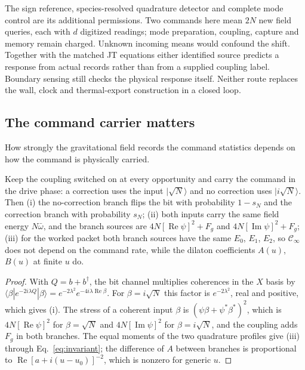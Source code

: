 The sign reference, species-resolved quadrature detector and complete mode
control are its additional permissions. Two commands here mean $2N$ new field
queries, each with $d$ digitized readings; mode preparation, coupling, capture
and memory remain charged. Unknown incoming means would confound the shift.
Together with the matched JT equations either identified source predicts a
response from actual records rather than from a supplied coupling label.
Boundary sensing still checks the physical response itself. Neither route
replaces the wall, clock and thermal-export construction in a closed loop.


\subsection{The command carrier matters}

How strongly the gravitational field records the command statistics depends on how the command is physically carried.

\begin{proposition}
\label{prop:carrier}
Keep the coupling switched on at every opportunity and carry the command in the drive phase: a correction uses the input $|\sqrt N\rangle$ and no correction uses $|i\sqrt N\rangle$. Then (i) the no-correction branch flips the bit with probability $1-s_N$ and the correction branch with probability $s_N$; (ii) both inputs carry the same field energy $N\bar\omega$, and the branch sources are $4N[\operatorname{Re}\psi]^2+F_g$ and $4N[\operatorname{Im}\psi]^2+F_g$; (iii) for the worked packet both branch sources have the same $E_0$, $E_1$, $E_2$, so $\mathcal C_\infty$ does not depend on the command rate, while the dilaton coefficients $A(u)$, $B(u)$ at finite $u$ do.
\end{proposition}

\begin{proof}
With $Q=b+b^\dagger$, the bit channel multiplies coherences in the $X$ basis by $\langle\beta|e^{-2i\lambda Q}|\beta\rangle=e^{-2\lambda^2}e^{-4i\lambda\operatorname{Re}\beta}$. For $\beta=i\sqrt N$ this factor is $e^{-2\lambda^2}$, real and positive, which gives (i). The stress of a coherent input $\beta$ is $(\psi\beta+\psi^*\beta^*)^2$, which is $4N[\operatorname{Re}\psi]^2$ for $\beta=\sqrt N$ and $4N[\operatorname{Im}\psi]^2$ for $\beta=i\sqrt N$, and the coupling adds $F_g$ in both branches. The equal moments of the two quadrature profiles give (iii) through Eq.~\eqref{eq:invariant}; the difference of $A$ between branches is proportional to $\operatorname{Re}[a+i(u-u_0)]^{-2}$, which is nonzero for generic $u$.
\end{proof}

